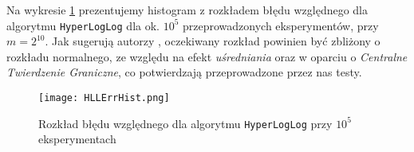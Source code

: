 \newpage

Na wykresie \ref{fig:hll_hist} prezentujemy histogram z rozkładem błędu względnego dla algorytmu \texttt{HyperLogLog} dla ok. $10^5$ przeprowadzonych eksperymentów, przy $m=2^{10}$. Jak sugerują autorzy \cite{hll}, oczekiwany rozkład powinien być zbliżony o rozkładu normalnego, ze względu na efekt \textit{uśredniania} oraz w oparciu o \textit{Centralne Twierdzenie Graniczne}, co potwierdzają przeprowadzone przez nas testy.

\begin{figure}[h!]
	\texttt{[image: HLLErrHist.png]}
	\centering
	\caption{Rozkład błędu względnego dla algorytmu \texttt{HyperLogLog} przy $10^5$ eksperymentach}
	\label{fig:hll_hist}
\end{figure}
